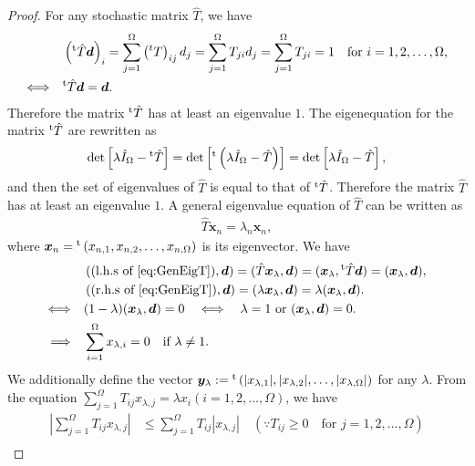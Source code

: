 \begin{proof}
	For any stochastic matrix $\hat{T}$, we have
	\begin{align}
	&\left({}^{\rm t}\hat{T}\bm{d}\right)_{i}=\sum_{j=1}^{\Omega}\left({}^{t}T\right)_{ij}d_{j}=\sum_{j=1}^{\Omega}T_{ji}d_{j}=\sum_{j=1}^{\Omega}T_{ji}=1\quad\text{for $i=1,2,\dots,\Omega$},\\
	\Longleftrightarrow\quad &{}^{\rm t}\hat{T}\bm{d} = \bm{d}.
	\end{align}
	Therefore the matrix ${}^{\rm t}\hat{T}$ has at least an eigenvalue $1$. The eigenequation for the matrix ${}^{\rm t}\hat{T}$ are rewritten as
	\begin{align}
	\det\left[\lambda \hat{I}_{\Omega} - {}^{\rm t}\hat{T}\right] = \det\left[{}^{\rm t}\left(\lambda \hat{I}_{\Omega} - \hat{T}\right)\right] = \det\left[\lambda \hat{I}_{\Omega} - \hat{T}\right],
	\end{align}
	and then the set of eigenvalues of $\hat{T}$ is equal to that of ${}^{\rm t}\hat{T}$. Therefore the matrix $\hat{T}$ has at least an eigenvalue $1$. A general eigenvalue equation of $\hat{T}$ can be written as
	\begin{align}
	\hat{T}\bm{x}_{n} = \lambda_{n}\bm{x}_{n}\label{eq:GenEigT},
	\end{align}
	where $\bm{x}_{n}={}^{\rm t}\left(x_{n,1},x_{n,2},\dots,x_{n,\Omega}\right)$ is its eigenvector. We have
	\begin{align}
	&\left((\text{l.h.s of \ref{eq:GenEigT}}),\bm{d}\right) = (\hat{T}\bm{x}_{\lambda},\bm{d}) = (\bm{x}_{\lambda},{}^{\rm t}\hat{T}\bm{d}) = (\bm{x}_{\lambda},\bm{d}),\\
	&\left((\text{r.h.s of \ref{eq:GenEigT}}),\bm{d}\right) = (\lambda\bm{x}_{\lambda},\bm{d}) = \lambda(\bm{x}_{\lambda},\bm{d}).\\
	\Longleftrightarrow \quad& (1-\lambda)(\bm{x}_{\lambda},\bm{d}) = 0\quad\Longleftrightarrow \quad \lambda = 1\text{ or }(\bm{x}_{\lambda},\bm{d}) = 0.\\
	\Longrightarrow \quad& \sum_{i=1}^{\Omega}x_{\lambda,i} = 0\quad\text{if $\lambda \neq 1$}.
	\end{align}
	We additionally define the vector $\bm{y}_{\lambda}:={}^{\rm t}\left(|x_{\lambda,1}|,|x_{\lambda,2}|,\dots,|x_{\lambda,\Omega}|\right)$ for any $\lambda$. From the equation $\sum_{j=1}^{\Omega}T_{ij}x_{\lambda,j}=\lambda x_{i}(i=1,2,\dots,\Omega)$, we have
	\begin{align}
	\left|\sum_{j=1}^{\Omega}T_{ij}x_{\lambda,j}\right| &\leq \sum_{j=1}^{\Omega}T_{ij}|x_{\lambda,j}|\quad(\because T_{ij}\geq 0\quad\text{for $j=1,2,\dots,\Omega$})\\

\end{align}
\end{proof}
